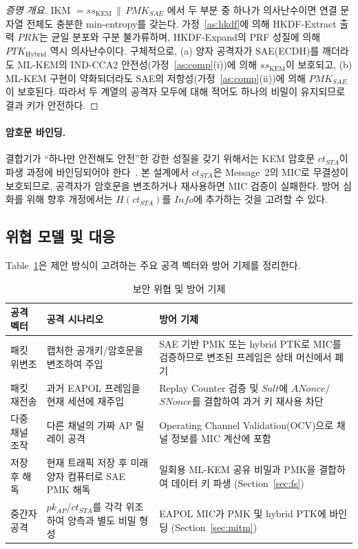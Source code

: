 \documentclass[11pt]{article}
\newcommand{\pkAP}{\ensuremath{pk_{AP}}}
\newcommand{\ctSTA}{\ensuremath{ct_{STA}}}
\newcommand{\ssK}{\ensuremath{ss_{\mathrm{KEM}}}}
\newcommand{\pmkSAE}{\ensuremath{PMK_{SAE}}}
\newcommand{\ptkH}{\ensuremath{PTK_{\mathrm{Hybrid}}}}
\newcommand{\ANonce}{\ensuremath{ANonce}}
\newcommand{\SNonce}{\ensuremath{SNonce}}
\newcommand{\cat}{\,\|\,}
\theoremstyle{definition}
\theoremstyle{plain}
\begin{document}
\begin{proof}[증명 개요]
IKM $=\ssK \cat \pmkSAE$ 에서 두 부분 중 하나가 의사난수이면 연결 문자열 전체도
충분한 min-entropy를 갖는다. 가정~\ref{as:hkdf}에 의해 HKDF-Extract 출력 $PRK$는
균일 분포와 구분 불가류하며, HKDF-Expand의 PRF 성질에 의해 \ptkH{} 역시
의사난수이다. 구체적으로, (a) 양자 공격자가 SAE(ECDH)를 깨더라도 ML-KEM의
IND-CCA2 안전성(가정~\ref{as:comp}(i))에 의해 \ssK{}이 보호되고, (b) ML-KEM
구현이 약화되더라도 SAE의 저항성(가정~\ref{as:comp}(ii))에 의해 \pmkSAE{}이
보호된다. 따라서 두 계열의 공격자 모두에 대해 적어도 하나의 비밀이 유지되므로
결과 키가 안전하다.
\end{proof}

\paragraph{암호문 바인딩.} 결합기가 ``하나만 안전해도 안전''한 강한 성질을
갖기 위해서는 KEM 암호문 \ctSTA{}이 파생 과정에 바인딩되어야 한다~\cite{giacon}.
본 설계에서 \ctSTA{}은 Message~2의 MIC로 무결성이 보호되므로, 공격자가 암호문을
변조하거나 재사용하면 MIC 검증이 실패한다. 방어 심화를 위해 향후 개정에서는
$H(\ctSTA)$를 $Info$에 추가하는 것을 고려할 수 있다.

\subsection{위협 모델 및 대응}
Table~\ref{tab:threat}은 제안 방식이 고려하는 주요 공격 벡터와 방어 기제를
정리한다.

\begin{table}[H]\centering
\caption{보안 위협 및 방어 기제}\label{tab:threat}
\small
\renewcommand{\arraystretch}{1.15}
\begin{tabularx}{\linewidth}{@{}p{20mm}XX@{}}
\toprule
공격 벡터 & 공격 시나리오 & 방어 기제 \\ \midrule
패킷 위변조 & 캡처한 공개키/암호문을 변조하여 주입
  & SAE 기반 PMK 또는 hybrid PTK로 MIC를 검증하므로 변조된 프레임은 상태
    머신에서 폐기 \\
패킷 재전송 & 과거 EAPOL 프레임을 현재 세션에 재주입
  & Replay Counter 검증 및 $Salt$에 \ANonce/\SNonce{}를 결합하여 과거 키
    재사용 차단 \\
다중 채널 조작 & 다른 채널의 가짜 AP 릴레이 공격
  & Operating Channel Validation(OCV)으로 채널 정보를 MIC 계산에 포함 \\
저장 후 해독 & 현재 트래픽 저장 후 미래 양자 컴퓨터로 SAE PMK 해독
  & 일회용 ML-KEM 공유 비밀과 PMK을 결합하여 데이터 키 파생 (Section~\ref{sec:fs}) \\
중간자 공격 & \pkAP{}/\ctSTA{}를 각각 위조하여 양측과 별도 비밀 형성
  & EAPOL MIC가 PMK 및 hybrid PTK에 바인딩 (Section~\ref{sec:mitm}) \\
\bottomrule
\end{tabularx}
\end{table}
\end{document}

